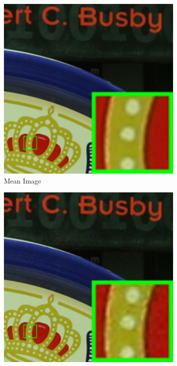 \begin{figure}
    \centering
    \begin{subfigure}[t]{0.19\textwidth}
        \centering
        \includegraphics[width=1\textwidth]{images/twsc/cc/resize_br_Mean_5dmark3_iso3200_1_real.png}
		\caption{Mean Image}
    \end{subfigure}
    \hfill
    \begin{subfigure}[t]{0.19\textwidth}
        \centering
        \includegraphics[width=1\textwidth]{images/twsc/cc/resize_br_Noisy_5dmark3_iso3200_1_real.png}

\end{subfigure}
\end{figure}
